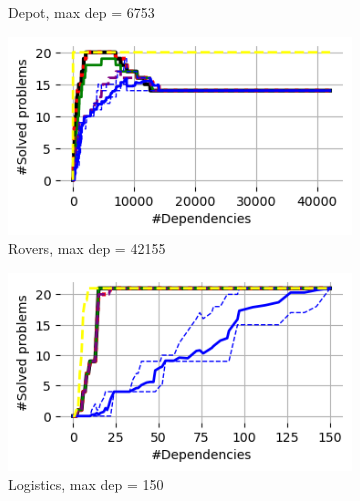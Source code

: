 \documentclass{article}
\theoremstyle{remark}
\begin{document}
\begin{figure}[t!]
\begin{subfigure}[b]{0.3\textwidth}
  \caption{Depot, max dep = 6753}
  \label{fig:Depot}
\end{subfigure}\hspace{1em}
\begin{subfigure}[b]{0.3\textwidth}
\centering
  \includegraphics[width=1\linewidth]{Results_graphs/Joint_Projection/With_Random/coverage_Joint_Projection_Rovers}
  \caption{Rovers, max dep = 42155}
  \label{fig:Rovers}
\end{subfigure}\hspace{1em}
\begin{subfigure}[b]{0.3\textwidth}
\centering
  \includegraphics[width=1\linewidth]{Results_graphs/Joint_Projection/With_Random/coverage_Joint_Projection_Logistics}
  \caption{Logistics, max dep = 150}
  \label{fig:Logistics}
\end{subfigure}\hspace{1em}
\begin{subfigure}[b]{0.3\textwidth}
\centering

\end{subfigure}
\end{figure}
\end{document}
